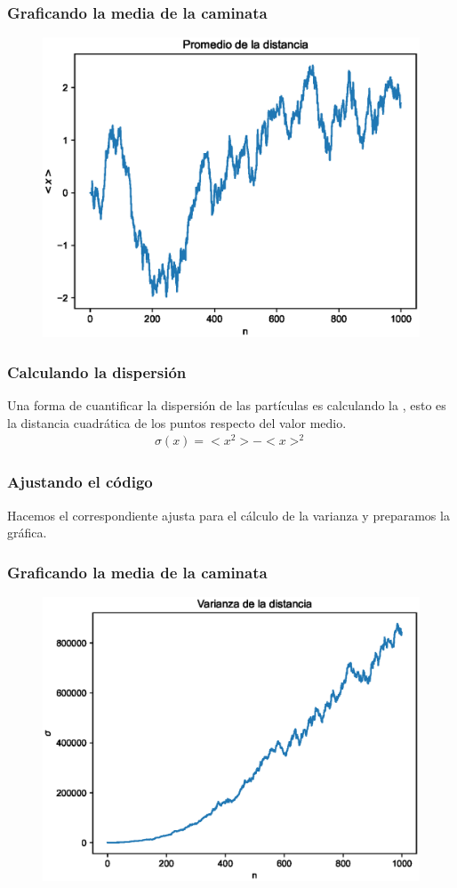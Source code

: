 \documentclass[12pt]{beamer}
\begin{document}
\begin{frame}
\frametitle{Graficando la media de la caminata}
\begin{figure}
    \includegraphics[scale=0.55]{Imagenes/plot_caminata_aleatoria_05.eps}
\end{figure}
\end{frame}
\begin{frame}
\frametitle{Calculando la dispersión}
Una forma de cuantificar la dispersión de las partículas es calculando la , \pause esto es la distancia cuadrática de los puntos respecto del valor medio.
\pause
\begin{align*}
\sigma (x) = < x^{2} > - < x >^{2}
\end{align*}
\end{frame}
\begin{frame}
\frametitle{Ajustando el código}
Hacemos el correspondiente ajusta para el cálculo de la varianza y preparamos la gráfica.
\end{frame}
\begin{frame}
\frametitle{Graficando la media de la caminata}
\begin{figure}
    \includegraphics[scale=0.55]{Imagenes/plot_caminata_aleatoria_06.eps}
\end{figure}
\end{frame}
\end{document}
